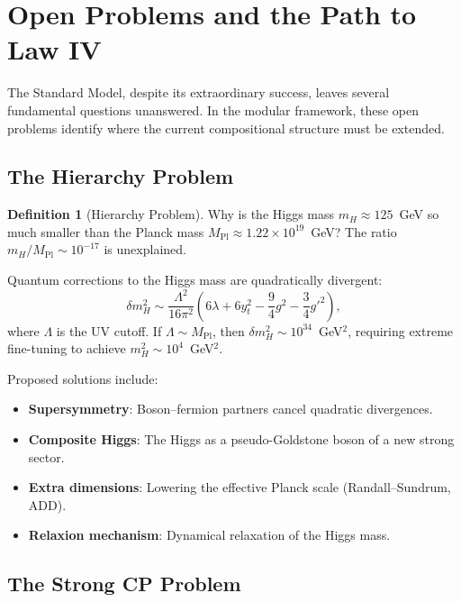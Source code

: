 \documentclass[12pt]{article}
\theoremstyle{definition}
\newtheorem{definition}[theorem]{Definition}
\theoremstyle{remark}
\newcommand{\Mpl}{M_{\mathrm{Pl}}}
\begin{document}
\section{Open Problems and the Path to Law IV}
\label{sec:open-problems}

The Standard Model, despite its extraordinary success, leaves several fundamental questions unanswered. In the modular framework, these open problems identify where the current compositional structure must be extended.

\subsection{The Hierarchy Problem}

\begin{definition}[Hierarchy Problem]
Why is the Higgs mass $m_H \approx 125$~GeV so much smaller than the Planck mass $\Mpl \approx 1.22 \times 10^{19}$~GeV? The ratio $m_H / \Mpl \sim 10^{-17}$ is unexplained.
\end{definition}

Quantum corrections to the Higgs mass are quadratically divergent:
\begin{equation}
\delta m_H^2 \sim \frac{\Lambda^2}{16\pi^2} \left( 6\lambda + 6 y_t^2 - \frac{9}{4} g^2 - \frac{3}{4} g'^2 \right),
\end{equation}
where $\Lambda$ is the UV cutoff. If $\Lambda \sim \Mpl$, then $\delta m_H^2 \sim 10^{34}$~GeV$^2$, requiring extreme fine-tuning to achieve $m_H^2 \sim 10^4$~GeV$^2$.

Proposed solutions include:
\begin{itemize}
\item \textbf{Supersymmetry}: Boson--fermion partners cancel quadratic divergences.
\item \textbf{Composite Higgs}: The Higgs as a pseudo-Goldstone boson of a new strong sector.
\item \textbf{Extra dimensions}: Lowering the effective Planck scale (Randall--Sundrum, ADD).
\item \textbf{Relaxion mechanism}: Dynamical relaxation of the Higgs mass.
\end{itemize}

\subsection{The Strong CP Problem}
\end{document}
